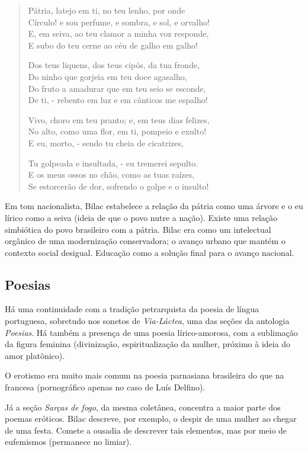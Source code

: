 \begin{verse}
Pátria, latejo em ti, no teu lenho, por onde \\
Círculo! e sou perfume, e sombra, e sol, e orvalho! \\
E, em seiva, ao teu clamor a minha voz responde, \\
E subo do teu cerne ao céu de galho em galho!

Dos teus liquens, dos teus cipós, da tua fronde, \\
Do ninho que gorjeia em teu doce agasalho, \\
Do fruto a amadurar que em teu seio se esconde, \\
De ti, - rebento em luz e em cânticos me espalho!

Vivo, choro em teu pranto; e, em teus dias felizes, \\
No alto, como uma flor, em ti, pompeio e exulto! \\
E eu, morto, - sendo tu cheia de cicatrizes,

Tu golpeada e insultada, - eu tremerei sepulto. \\
E os meus ossos no chão, como as tuas raízes, \\
Se estorcerão de dor, sofrendo o golpe e o insulto!
\end{verse}

Em tom nacionalista, Bilac estabelece a relação da pátria como uma árvore e o eu lírico como a seiva (ideia de que o povo nutre a nação). Existe uma relação simbiótica do povo brasileiro com a pátria. Bilac era como um intelectual orgânico de uma modernização conservadora; o avanço urbano que mantém o contexto social desigual. Educação como a solução final para o avanço nacional.

\subsection{Poesias}

Há uma continuidade com a tradição petrarquista da poesia de língua portuguesa, sobretudo nos sonetos de \textit{Via-Láctea}, uma das seções da antologia \textit{Poesias}. Há também a presença de uma poesia lírico-amorosa, com a sublimação da figura feminina (divinização, espiritualização da mulher, próximo à ideia do amor platônico).

O erotismo era muito mais comum na poesia parnasiana brasileira do que na francesa (pornográfico apenas no caso de Luís Delfino).

Já a seção \textit{Sarças de fogo}, da mesma coletânea, concentra a maior parte dos poemas eróticos. Bilac descreve, por exemplo, o despir de uma mulher ao chegar de uma festa. Comete a ousadia de descrever tais elementos, mas por meio de eufemismos (permanece no limiar).

